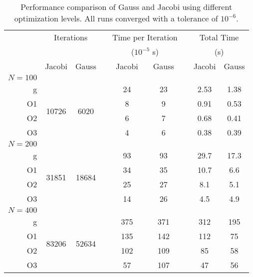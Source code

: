 \newcommand{\mct}[1]{\multicolumn{2}{c}{#1}}
\newcommand{\pht}{\phantom{a}}
\newcommand{\mrt}[1]{\multirow{4}{*}{#1}}
\begin{table}[H]
\caption{Performance comparison of Gauss and Jacobi using different
optimization levels. All runs converged with a tolerance of
$10^{-6}$.}
\label{tab:performance}
\centering
\begin{tabular}{@{}r cc c cc c cc @{}}
    \toprule
    & \mct{Iterations} & \pht & \mct{Time per Iteration} & \pht & \mct{Total Time}\\
    &         &        & \pht & \mct{($10^{-5}$ s)}        & \pht & \mct{(s)}       \\
    \cmidrule{2-3} \cmidrule{5-6} \cmidrule {8-9}
     & Jacobi & Gauss && Jacobi & Gauss && Jacobi & Gauss\\
    \midrule

$N = 100$\\
     g & \mrt{10726} & \mrt{6020} && 24 & 23 &&  2.53 &  1.38 \\
    O1 &  &  && 8 & 9 &&  0.91 &  0.53 \\
    O2 &  &  && 6 & 7 &&  0.68 &  0.41 \\
    O3 &  &  && 4 & 6 &&  0.38 &  0.39 \\
$N = 200$\\
     g & \mrt{31851} & \mrt{18684} && 93 & 93 &&  29.7 &  17.3 \\
    O1 &  &  && 34 & 35 &&  10.7 &   6.6 \\
    O2 &  &  && 25 & 27 &&   8.1 &   5.1 \\
    O3 &  &  && 14 & 26 &&   4.5 &   4.9 \\
$N = 400$\\
     g & \mrt{83206} & \mrt{52634} && 375 & 371 &&   312 &   195 \\
    O1 &  &  && 135 & 142 &&   112 &    75 \\
    O2 &  &  && 102 & 109 &&    85 &    58 \\
    O3 &  &  && 57 & 107 &&    47 &    56 \\

    \bottomrule
\end{tabular}
\end{table}
